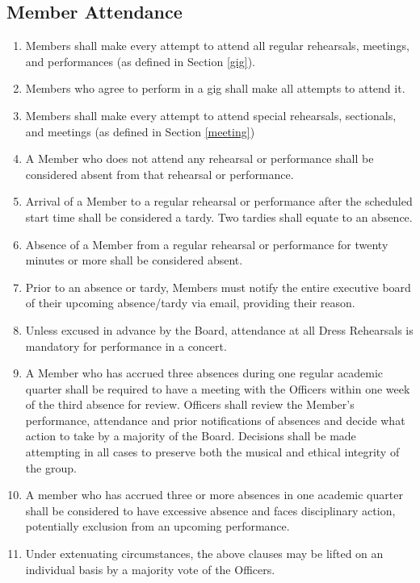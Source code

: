 \documentclass{article}
\begin{document}
\subsection{Member Attendance} \label{attendance}
\begin{enumerate}
\item Members shall make every attempt to attend all regular rehearsals,
  meetings, and performances (as defined in Section \ref{gig}).
\item Members who agree to perform in a gig shall
  make all attempts to attend it.
\item Members shall make every attempt to attend special rehearsals, sectionals,
  and meetings (as defined in Section \ref{meeting})
\item A Member who does not attend any rehearsal or performance shall be
  considered absent from that rehearsal or performance.
\item Arrival of a Member to a regular rehearsal or performance after the
  scheduled start time shall be considered a tardy. Two tardies shall equate to
  an absence.
\item Absence of a Member from a regular rehearsal or performance for twenty
  minutes or more shall be considered absent.
\item Prior to an absence or tardy, Members must notify the entire executive
  board of their upcoming absence/tardy via email, providing their reason.
\item Unless excused in advance by the Board, attendance at all Dress Rehearsals
  is mandatory for performance in a concert.
\item A Member who has accrued three absences during one regular academic
  quarter shall be required to have a meeting with the Officers within one week
  of the third absence for review. Officers shall review the Member's
  performance, attendance and prior notifications of absences and decide what
  action to take by a majority of the Board. Decisions shall be made attempting
  in all cases to preserve both the musical and ethical integrity of the group.
\item A member who has accrued three or more absences in one academic quarter
  shall be considered to have excessive absence and faces disciplinary action,
  potentially exclusion from an upcoming performance.
\item Under extenuating circumstances, the above clauses may be lifted on
  an individual basis by a majority vote of the Officers.
\end{enumerate}
\end{document}
